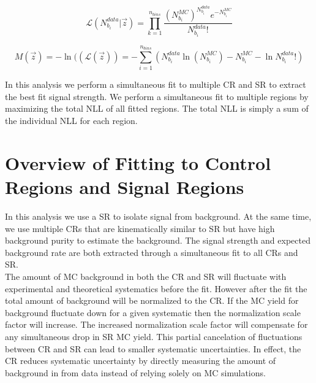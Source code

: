 \begin{equation}
\label{eqn:binnedlikelihood2}
{\mathcal{L}}(N^{data}_{b_i}|\vec{z}) = {\displaystyle\prod_{k=1}^{n_{bins}} \frac{(N^{MC}_{b_i})^{N^{data}_{b_i}}e^{-N^{MC}_{b_i}}}{N^{data}_{b_i}!}}
\end{equation}

\begin{equation}
\label{eqn:binnedNLL2}
M(\vec{z})=-\ln(({\mathcal{L}}(\vec{z})) = -{\displaystyle\sum_{i=1}^{n_{bins}}} ( N^{data}_{b_i} \ln( N^{MC}_{b_i} ) - N^{MC}_{b_i} - \ln{N^{data}_{b_i}!} )
\end{equation}

\indent In this analysis we perform a simultaneous fit to multiple CR and SR to extract the best fit signal strength.  We perform a simultaneous fit to multiple regions by maximizing the total NLL of all fitted regions.  The total NLL is simply a sum of the individual NLL for each region.  \\

\section{Overview of Fitting to Control Regions and Signal Regions}
\label{sec:stat:Bkg}

\indent In this analysis we use a SR to isolate signal from background.  At the same time, we use multiple CRs that are kinematically similar to SR but have high background purity to estimate the background.  The signal strength and expected background rate are both extracted through a simultaneous fit to all CRs and SR.  \\


\indent The amount of MC background in both the CR and SR will fluctuate with experimental and theoretical systematics before the fit.  However after the fit the total amount of background will be normalized to the CR.  If the MC yield for background fluctuate down for a given systematic then the normalization scale factor will increase.  The increased normalization scale factor will compensate for any simultaneous drop in SR MC yield.  This partial cancelation of fluctuations between CR and SR can lead to smaller systematic uncertainties.  In effect, the CR reduces systematic uncertainty by directly measuring the amount of background in from data instead of relying solely on MC simulations.  \\

